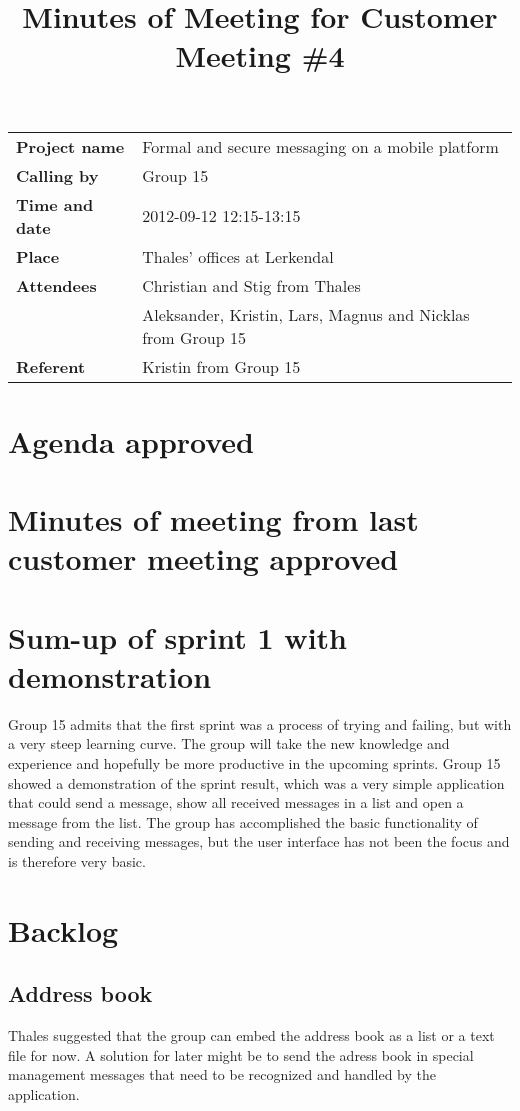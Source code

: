 \documentclass[a4paper,12pt]{article}
\begin{document}
\title{Minutes of Meeting for Customer Meeting \#4}
\maketitle
\begin{tabular}{>{\bfseries}l l}	
Project name&Formal and secure messaging on a mobile platform\\
Calling by&Group 15\\
Time and date&2012-09-12 12:15-13:15\\
Place&Thales' offices at Lerkendal\\
Attendees&Christian and Stig from Thales\\
& Aleksander, Kristin, Lars, Magnus and Nicklas from Group 15 \\
Referent&Kristin from Group 15\\
\end{tabular}

\section{Agenda approved}
\section{Minutes of meeting from last customer meeting approved}
\section{Sum-up of sprint 1 with demonstration}
Group 15 admits that the first sprint was a process of trying and failing, but with a very steep learning curve.
The group will take the new knowledge and experience and hopefully be more productive in the upcoming sprints.
\newline
\newline
Group 15 showed a demonstration of the sprint result, which was a very simple 
application that could send a message, show all received messages in a list and open a message from the list.
The group has accomplished the basic functionality of sending and receiving messages, but the user interface has
not been the focus and is therefore very basic.
\section{Backlog}
\subsection{Address book}
Thales suggested that the group can embed the address book as a list or a text file for now. 
A solution for later might be to send the adress book in special management messages that need to be recognized and handled by
the application.
\end{document}
